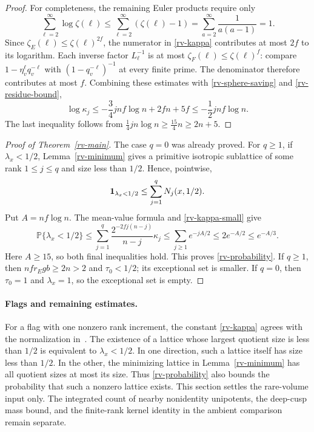 \begin{proof}
For completeness, the remaining Euler products
require only
\[
 \sum_{\ell=2}^{\infty}\log\zeta(\ell)
 \le\sum_{\ell=2}^{\infty}(\zeta(\ell)-1)
 =\sum_{a=2}^{\infty}\frac1{a(a-1)}=1.
\]
Since $\zeta_E(\ell)\le\zeta(\ell)^{2f}$, the numerator
in \eqref{rv-kappa} contributes at most $2f$ to its
logarithm.  Each inverse factor $L_\ell^{-1}$ is at
most $\zeta_F(\ell)\le\zeta(\ell)^f$: compare
$1-\eta_v^\ell q_v^{-\ell}$ with
$(1-q_v^{-\ell})^{-1}$ at every finite prime.
The denominator therefore contributes at most $f$.
Combining these estimates with
\eqref{rv-sphere-saving} and \eqref{rv-residue-bound},
\[
        \log\kappa_j
          \le-\frac34jnf\log n+2fn+5f
          \le-\frac12jnf\log n .
\]
The last inequality follows from
$\tfrac14jn\log n\ge\tfrac{15}{4}n\ge2n+5$.
\end{proof}

\begin{proof}[Proof of Theorem~\ref{rv-main}]
The case $q=0$ was already proved.
For $q\ge1$, if $\lambda_x<1/2$,
Lemma~\ref{rv-minimum} gives a primitive isotropic
sublattice of some rank $1\le j\le q$ and size
less than $1/2$.  Hence, pointwise,
\[
              {\bf1}_{\lambda_x<1/2}
                     \le\sum_{j=1}^{q}N_j(x,1/2).
\]
Put $A=nf\log n$.  The mean-value formula and
\eqref{rv-kappa-small} give
\[
 \mathbb P\{\lambda_x<1/2\}
 \le\sum_{j=1}^{q}
        \frac{2^{-2fj(n-j)}}{n-j}\kappa_j
 \le\sum_{j\ge1}e^{-jA/2}
 \le2e^{-A/2}\le e^{-A/3}.
\]
Here $A\ge15$, so both final inequalities hold.
This proves \eqref{rv-probability}.
If $q\ge1$, then $nfr_Egb\ge2n>2$ and
$\tau_0<1/2$; its exceptional set is smaller.
If $q=0$, then $\tau_0=1$ and $\lambda_x=1$,
so the exceptional set is empty.
\end{proof}

\paragraph{Flags and remaining estimates.}
For a flag with one nonzero rank increment, the constant
\eqref{rv-kappa} agrees with the normalization
in~\cite{alpo-uniform-source}.  The existence of a lattice
whose largest quotient size is less than $1/2$ is equivalent
to $\lambda_x<1/2$.  In one direction, such a lattice itself
has size less than $1/2$.  In the other, the minimizing lattice
in Lemma~\ref{rv-minimum} has all quotient sizes at most its size.
Thus \eqref{rv-probability} also bounds the probability
that such a nonzero lattice exists.
This section settles the rare-volume input only.
The integrated count of nearby nonidentity unipotents,
the deep-cusp mass bound, and the finite-rank kernel
identity in the ambient comparison remain separate.


